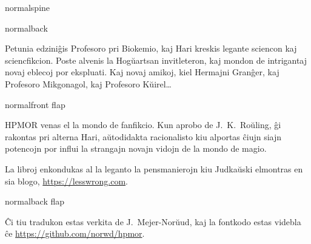 \documentclass[12pt,coverwidth=\the\hpcoverwidth,coverheight=\the\hpcoverheight,spinewidth=\the\hpspinewidth,marklength=0mm,bleedwidth=5mm,flapwidth=63mm]{bookcover}
\begin{document}
\begin{bookcover}

\begin{bookcoverelement}{normal}{spine}
\centering
\color{white}\scshape
\vspace{0.5cm}\huge \volumenumber\\[2ex]\Large
\vfill
{}
\vfill
\end{bookcoverelement}

\begin{bookcoverelement}{normal}{back}
  \centering
  \vspace{20mm}
  \parbox{110mm}{\color{white}\Large\raggedright
Petunia edziniĝis Profesoro pri Biokemio, kaj Hari kreskis legante sciencon kaj sciencfikcion. Poste alvenis la Hogŭartsan invitleteron, kaj mondon de intrigantaj novaj eblecoj por ekspluati. Kaj novaj amikoj, kiel Hermajni Granĝer, kaj Profesoro Mikgonagol, kaj Profesoro Kŭirel…
}
\end{bookcoverelement}

\begin{bookcoverelement}{normal}{front flap}
\centering
\vspace{20mm}
\parbox{40mm}{\color{white}\raggedright\small
  HPMOR venas el la mondo de fanfikcio. Kun aprobo de J.~K.~Roŭling, ĝi rakontas pri alterna Hari, aŭtodidakta racionalisto kiu alportas ĉiujn siajn potencojn por influi la strangajn novajn vidojn de la mondo de magio.

  \bigskip La libroj enkondukas al la leganto la pensmanierojn kiu Judkaŭski elmontras en sia blogo, \url{https://lesswrong.com}.}
\end{bookcoverelement}

\begin{bookcoverelement}{normal}{back flap}
\centering
\vspace{20mm}
\parbox{40mm}{\color{white}\small\raggedright
  Ĉi tiu tradukon estas verkita de J.~Mejer\nobreakdash-Norŭud, kaj la fontkodo estas videbla ĉe \url{https://github.com/norwd/hpmor}.
}
\end{bookcoverelement}

\end{bookcover}
\end{document}
